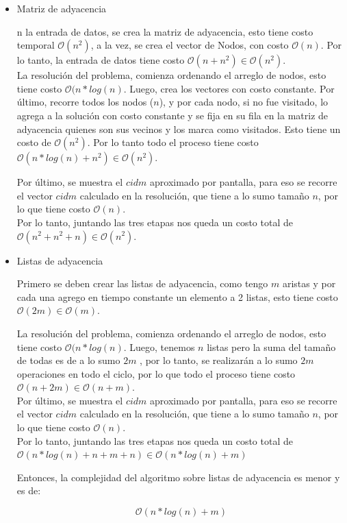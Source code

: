 \begin{itemize}

\item Matriz de adyacencia

n la entrada de datos, se crea la matriz de adyacencia, esto tiene costo temporal $\mathcal{O}(n^2)$, a la vez, se crea el vector de Nodos, con costo $\mathcal{O}(n)$. Por lo tanto, la entrada de datos tiene costo $\mathcal{O}(n + n^2) \in \mathcal{O}(n^2)$. \\

La resolución del problema, comienza ordenando el arreglo de nodos, esto tiene costo  $\mathcal{O}(n*log(n)$. Luego, crea los vectores con costo constante. Por último, recorre todos los nodos ($n$), y por cada nodo, si no fue visitado, lo agrega a la solución con costo constante y se fija en su fila en la matriz de adyacencia quienes son sus vecinos y los marca como visitados. Esto tiene un costo de $\mathcal{O}(n^2)$. Por lo tanto todo el proceso tiene costo $\mathcal{O}(n*log(n) + n^2) \in \mathcal{O}(n^2)$.

Por último, se muestra el $cidm$ aproximado por pantalla, para eso se recorre el vector $cidm$ calculado en la resolución, que tiene a lo sumo tamaño $n$, por lo que tiene costo $\mathcal{O}(n)$. \\

Por lo tanto, juntando las tres etapas nos queda un costo total de  $\mathcal{O}(n^2 + n^2 + n) \in \mathcal{O}(n^2)$.\\

\item Listas de adyacencia

Primero se deben crear las listas de adyacencia, como tengo $m$ aristas y por cada una agrego en tiempo constante un elemento a 2 listas, esto tiene costo $\mathcal{O}(2m) \in  \mathcal{O}(m)$.

La resolución del problema, comienza ordenando el arreglo de nodos, esto tiene costo  $\mathcal{O}(n*log(n)$. Luego, tenemos $n$ listas pero la suma del tamaño de todas es de a lo sumo $2m$ , por lo tanto, se realizarán a lo sumo $2m$ operaciones en todo el ciclo, por lo que todo el proceso tiene costo $\mathcal{O}(n + 2m) \in \mathcal{O}(n + m)$. \\

Por último, se muestra el $cidm$ aproximado por pantalla, para eso se recorre el vector $cidm$ calculado en la resolución, que tiene a lo sumo tamaño $n$, por lo que tiene costo $\mathcal{O}(n)$. \\

Por lo tanto, juntando las tres etapas nos queda un costo total de  $\mathcal{O}(n*log(n) + n + m + n) \in \mathcal{O}(n*log(n) + m )$

Entonces, la complejidad del algoritmo sobre listas de adyacencia es menor y es de:

$$ \mathcal{O}(n*log(n) + m)$$

\end{itemize}

